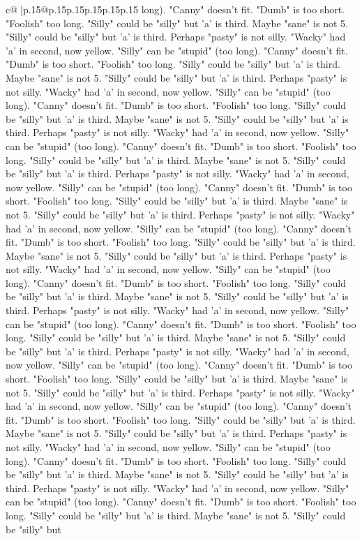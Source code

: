 \documentclass{article}
\begin{document}
{\begin{supertabular}{c@{$\;$}|p{.15\linewidth}@{}p{.15\linewidth}p{.15\linewidth}p{.15\linewidth}p{.15\linewidth}p{.15\linewidth}}
{{{long). "Canny" doesn't fit. "Dumb" is too short. "Foolish" too long. "Silly" could be "silly" but 'a' is third. Maybe "sane" is not 5. "Silly" could be "silly" but 'a' is third. Perhaps "pasty" is not silly. "Wacky" had 'a' in second, now yellow. "Silly" can be "stupid" (too long). "Canny" doesn't fit. "Dumb" is too short. "Foolish" too long. "Silly" could be "silly" but 'a' is third. Maybe "sane" is not 5. "Silly" could be "silly" but 'a' is third. Perhaps "pasty" is not silly. "Wacky" had 'a' in second, now yellow. "Silly" can be "stupid" (too long). "Canny" doesn't fit. "Dumb" is too short. "Foolish" too long. "Silly" could be "silly" but 'a' is third. Maybe "sane" is not 5. "Silly" could be "silly" but 'a' is third. Perhaps "pasty" is not silly. "Wacky" had 'a' in second, now yellow. "Silly" can be "stupid" (too long). "Canny" doesn't fit. "Dumb" is too short. "Foolish" too long. "Silly" could be "silly" but 'a' is third. Maybe "sane" is not 5. "Silly" could be "silly" but 'a' is third. Perhaps "pasty" is not silly. "Wacky" had 'a' in second, now yellow. "Silly" can be "stupid" (too long). "Canny" doesn't fit. "Dumb" is too short. "Foolish" too long. "Silly" could be "silly" but 'a' is third. Maybe "sane" is not 5. "Silly" could be "silly" but 'a' is third. Perhaps "pasty" is not silly. "Wacky" had 'a' in second, now yellow. "Silly" can be "stupid" (too long). "Canny" doesn't fit. "Dumb" is too short. "Foolish" too long. "Silly" could be "silly" but 'a' is third. Maybe "sane" is not 5. "Silly" could be "silly" but 'a' is third. Perhaps "pasty" is not silly. "Wacky" had 'a' in second, now yellow. "Silly" can be "stupid" (too long). "Canny" doesn't fit. "Dumb" is too short. "Foolish" too long. "Silly" could be "silly" but 'a' is third. Maybe "sane" is not 5. "Silly" could be "silly" but 'a' is third. Perhaps "pasty" is not silly. "Wacky" had 'a' in second, now yellow. "Silly" can be "stupid" (too long). "Canny" doesn't fit. "Dumb" is too short. "Foolish" too long. "Silly" could be "silly" but 'a' is third. Maybe "sane" is not 5. "Silly" could be "silly" but 'a' is third. Perhaps "pasty" is not silly. "Wacky" had 'a' in second, now yellow. "Silly" can be "stupid" (too long). "Canny" doesn't fit. "Dumb" is too short. "Foolish" too long. "Silly" could be "silly" but 'a' is third. Maybe "sane" is not 5. "Silly" could be "silly" but 'a' is third. Perhaps "pasty" is not silly. "Wacky" had 'a' in second, now yellow. "Silly" can be "stupid" (too long). "Canny" doesn't fit. "Dumb" is too short. "Foolish" too long. "Silly" could be "silly" but 'a' is third. Maybe "sane" is not 5. "Silly" could be "silly" but 'a' is third. Perhaps "pasty" is not silly. "Wacky" had 'a' in second, now yellow. "Silly" can be "stupid" (too long). "Canny" doesn't fit. "Dumb" is too short. "Foolish" too long. "Silly" could be "silly" but 'a' is third. Maybe "sane" is not 5. "Silly" could be "silly" but 'a' is third. Perhaps "pasty" is not silly. "Wacky" had 'a' in second, now yellow. "Silly" can be "stupid" (too long). "Canny" doesn't fit. "Dumb" is too short. "Foolish" too long. "Silly" could be "silly" but 'a' is third. Maybe "sane" is not 5. "Silly" could be "silly" but }}}
\end{supertabular}}
\end{document}
